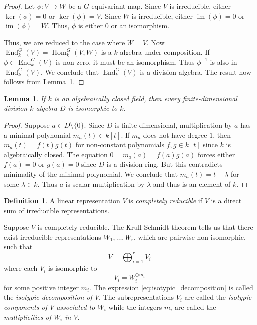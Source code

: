 \documentclass[12pt]{article}
\theoremstyle{plain}
\newtheorem{lemma}[theorem]{Lemma}
\theoremstyle{definition}
\newtheorem{definition}[theorem]{Definition}
\theoremstyle{remark}
\numberwithin{equation}{section}
\begin{document}
\begin{proof}
Let $\phi : V \to W$ be a $G$-equivariant map.
Since $V$ is irreducible, either $\ker(\phi)=0$ or $\ker(\phi)=V$.
Since $W$ is irreducible, either $\operatorname{im}(\phi)=0$
or $\operatorname{im}(\phi)=W$.
Thus, $\phi$ is either $0$ or an isomorphism.

Thus, we are reduced to the case where $W=V$.
Now $\operatorname{End}^G_k(V)=\operatorname{Hom}_k^G(V,W)$
is a $k$-algebra under composition.
If $\phi \in \operatorname{End}^G_k(V)$ is non-zero, it must be an isomorphism.
Thus $\phi^{-1}$ is also in $\operatorname{End}^G_k(V)$.
We conclude that $\operatorname{End}^G_k(V)$ is a division algebra.
The result now follows from Lemma~\ref{lem:division_over_kbar}.
\end{proof}

\begin{lemma} \label{lem:division_over_kbar}
If $k$ is an algebraically closed field,
then every finite-dimensional division $k$-algebra $D$
is isomorphic to $k$. 
\end{lemma}

\begin{proof}
Suppose $a \in D \setminus \{0\} $.
Since $D$ is finite-dimensional, multiplication by $a$
has a minimal polynomial $m_a(t) \in k[t]$.
If $m_a$ does not have degree $1$, then $m_a(t)=f(t)g(t)$
for non-constant polynomials $f,g \in k[t]$ since $k$ is algebraically
closed.
The equation $0=m_a(a)=f(a)g(a)$ forces either $f(a)=0$ or $g(a)=0$
since $D$ is a division ring.  But this contradicts minimality of
the minimal polynomial.  We conclude that $m_a(t)=t-\lambda$ for some
$\lambda \in k$.  Thus $a$ is scalar multiplication by $\lambda$
and thus is an element of $k$.
\end{proof}

\begin{definition}
A linear representation $V$ is \emph{completely reducible}
if $V$ is a direct sum of irreducible representations.
\end{definition}

Suppose $V$ is completely reducible.
The Krull-Schmidt theorem tells us that there exist irreducible
representations $W_1, \ldots, W_r$, which are pairwise non-isomorphic,
such that
\begin{equation} \label{eq:isotypic_decomposition}
V = \bigoplus_{i=1}^r V_i
\end{equation}
where each $V_i$ is isomorphic to
\[
V_i = W_i^{\oplus m_i}
\]
for some positive integer $m_i$.
The expression \eqref{eq:isotypic_decomposition} is called the
\emph{isotypic decomposition of $V$}.
The subrepresentations $V_i$ are called the \emph{isotypic components of
$V$ associated to $W_i$} while the integers $m_i$ are called the
\emph{multiplicities of $W_i$ in $V$}.
\end{document}
